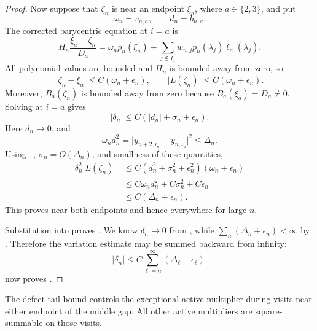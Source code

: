 \documentclass[11pt]{article}
\begin{document}
\begin{proof}
Now suppose that \(\zeta_n\) is near an endpoint \(\xi_a\), where
\(a\in\{2,3\}\), and put
\[
 \omega_n=v_{n,a},\qquad d_n=b_{n,a}.
\]
The corrected barycentric equation at \(i=a\) is
\[
 H_n\frac{\xi_a-\zeta_n}{D_a}
 =\omega_np_n(\xi_a)
 +\sum_{j\notin I_\star}
   w_{n,j}p_n(\lambda_j)\ell_a(\lambda_j).
\tag{47}\label{eq:endpoint-barycentric}
\]
All polynomial values are bounded and \(H_n\) is bounded away from zero,
so
\[
 \lvert\zeta_n-\xi_a\rvert\leq C(\omega_n+\epsilon_n),
 \qquad
 \lvert L(\zeta_n)\rvert\leq C(\omega_n+\epsilon_n).
\tag{48}\label{eq:endpoint-distance}
\]
Moreover, \(B_a(\zeta_n)\) is bounded away from zero because
\(B_a(\xi_a)=D_a\neq0\).  Solving
 at \(i=a\) gives
\[
 \lvert\delta_n\rvert
 \leq C(\lvert d_n\rvert+\sigma_n+\epsilon_n).
\tag{49}\label{eq:delta-from-d}
\]
Here \(d_n\to0\), and
\[
 \omega_nd_n^2
 =\lvert y_{n+2,\iota_a}-y_{n,\iota_a}\rvert^2
 \leq\Delta_n.
\tag{50}\label{eq:endpoint-energy}
\]
Using --,
\(\sigma_n=O(\Delta_n)\), and smallness of these quantities,
\[
 \begin{aligned}
 \delta_n^2\lvert L(\zeta_n)\rvert
 &\leq C(d_n^2+\sigma_n^2+\epsilon_n^2)
          (\omega_n+\epsilon_n)\\
 &\leq C\omega_nd_n^2+C\sigma_n^2+C\epsilon_n\\
 &\leq C(\Delta_n+\epsilon_n).
 \end{aligned}
\]
This proves  near both endpoints and hence
everywhere for large \(n\).

Substitution into  proves
.  We know \(\delta_n\to0\) from
, while
\(\sum_n(\Delta_n+\epsilon_n)<\infty\) by
.  Therefore the variation estimate may be summed
backward from infinity:
\[
 \lvert\delta_n\rvert
 \leq C\sum_{\ell=n}^{\infty}(\Delta_\ell+\epsilon_\ell).
\]
 now proves .
\end{proof}

The defect-tail bound controls the exceptional active multiplier during
visits near either endpoint of the middle gap.  All other active
multipliers are square-summable on those visits.
\end{document}

